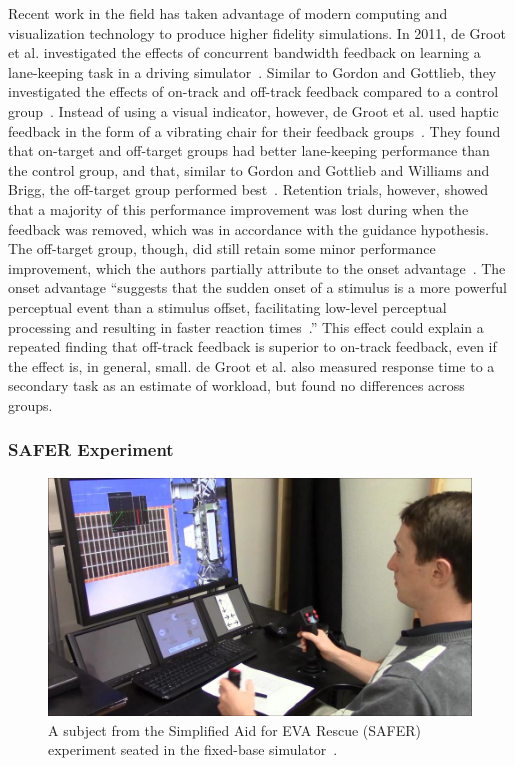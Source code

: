 Recent work in the field has taken advantage of modern computing and visualization technology to produce higher fidelity simulations.
In 2011, de Groot et al. investigated the effects of concurrent bandwidth feedback on learning a lane-keeping task in a driving simulator~\citep{de_groot_effect_2011}.
Similar to Gordon and Gottlieb, they investigated the effects of on-track and off-track feedback compared to a control group~\citep{gordon_effect_1967}.
Instead of using a visual indicator, however, de Groot et al. used haptic feedback in the form of a vibrating chair for their feedback groups~\citep{de_groot_effect_2011}.
They found that on-target and off-target groups had better lane-keeping performance than the control group, and that, similar to Gordon and Gottlieb and Williams and Brigg, the off-target group performed best~\citep{gordon_effect_1967,williams_-target_1962}.
Retention trials, however, showed that a majority of this performance improvement was lost during when the feedback was removed, which was in accordance with the guidance hypothesis.
The off-target group, though, did still retain some minor performance improvement, which the authors partially attribute to the onset advantage~\citep{fischer_differential_2008}.
The onset advantage ``suggests that the sudden onset of a stimulus is a more powerful perceptual event than a stimulus offset, facilitating low-level perceptual processing and resulting in faster reaction times~\citep{de_groot_effect_2011}.''
This effect could explain a repeated finding that off-track feedback is superior to on-track feedback, even if the effect is, in general, small.
de Groot et al. also measured response time to a secondary task as an estimate of workload, but found no differences across groups.

\subsubsection{SAFER Experiment}
\begin{figure}[b!]
    \begin{center}
        \includegraphics[width=0.8\linewidth]{figures/SAFER_DangerChris.jpg}
        \caption{A subject from the Simplified Aid for EVA Rescue (SAFER) experiment seated in the fixed-base simulator~\citep{karasinski_real-time_2016}.}
        \label{figure:safersim}
    \end{center}
\end{figure}

